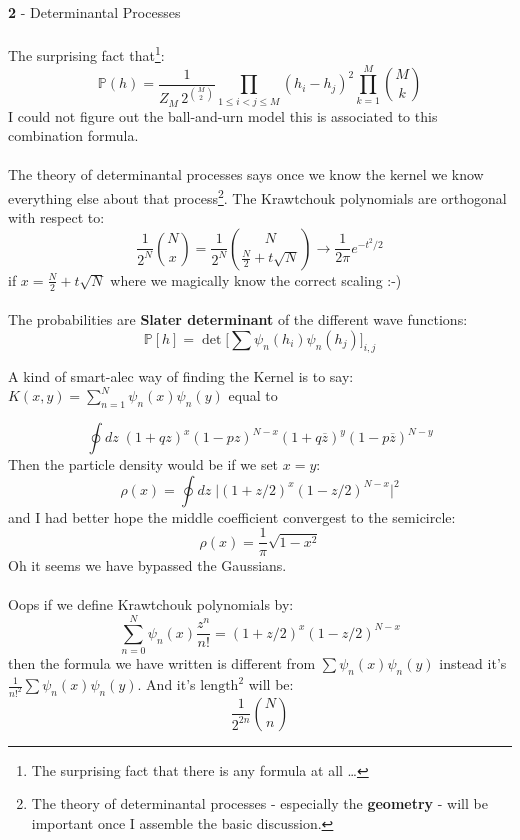 \documentclass[12pt]{article}
\begin{document}
\noindent \textbf{2} - Determinantal Processes \\ \\
The surprising fact that\footnote{The surprising fact that there is any formula at all \dots}:
$$ \mathbb{P}(h)
= \frac{1}{Z_M \, 2^{\binom{M}{2}}} \prod_{1 \leq i < j \leq M}
(h_i - h_j)^2 \prod_{k=1}^M
\binom{M}{k}
 $$
I could not figure out the ball-and-urn model this is associated to this combination formula. \\ \\
The theory of determinantal processes says once we know the kernel we know everything else about that process\footnote{The theory of determinantal processes - especially the \textbf{geometry} - will be important once I assemble the basic discussion.}.  The Krawtchouk polynomials are orthogonal with respect to:
$$ \frac{1}{2^N} \binom{N}{x} =
  \frac{1}{2^N} \binom{N}{\frac{N}{2} + t \sqrt{N}} \to \frac{1}{2\pi } e^{-t^2 / 2}$$
if $ x = \frac{N}{2} + t \sqrt{N}$ where we magically know the correct scaling :-) \\ \\
The probabilities are \textbf{Slater determinant} of the different wave functions:
$$ \mathbb{P}[h] = \det \Big[ \sum \psi_n(h_i)\psi_n(h_j) \Big]_{i,j}$$

\newpage

\noindent A kind of smart-alec way of finding the Kernel is to say: $K(x,y) = \sum_{n=1}^N \psi_n(x)\psi_n(y)$ equal to

$$ 
\oint dz \; (1+qz)^x(1-pz)^{N-x}
(1+q\overline{z})^y(1-p\overline{z})^{N-y}
$$
Then the particle density would be if we set $x = y$:
$$ \rho(x) =
\oint dz \; \Big|(1+z/2)^x(1-z/2)^{N-x}\Big|^2
 $$
 and I had better hope the middle coefficient convergest to the semicircle:
 $$ \rho(x) = \frac{1}{\pi}\sqrt{1-x^2}$$
Oh it seems we have bypassed the Gaussians.  \\ \\
Oops if we define Krawtchouk polynomials by:
$$ \sum_{n=0}^N \psi_n(x) \frac{z^n}{n!} = (1+z/2)^x (1-z/2)^{N-x} $$
then the formula we have written is different from 
$\sum \psi_n(x) \psi_n(y)$ instead it's $\frac{1}{n!^2}\sum \psi_n(x) \psi_n(y)$.  And it's $\text{length}^\text{2}$ will be:
$$ \frac{1}{2^{2n}}\binom{N}{n} $$
\newpage
\end{document}
